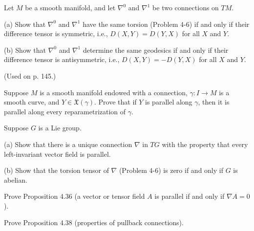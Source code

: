 \begin{exercise}
\label{prob:connections-difference-tensor}
Let $M$ be a smooth manifold, and let $\nabla^0$ and $\nabla^1$ be two connections on $TM$.

(a) Show that $\nabla^0$ and $\nabla^1$ have the same torsion (Problem 4-6) if and only if their difference tensor is symmetric, i.e., $D(X,Y) = D(Y,X)$ for all $X$ and $Y$.

(b) Show that $\nabla^0$ and $\nabla^1$ determine the same geodesics if and only if their difference tensor is antisymmetric, i.e., $D(X,Y) = -D(Y,X)$ for all $X$ and $Y$.

(Used on p. 145.)
\end{exercise}

\begin{exercise}
\label{prob:parallel-reparametrization}
Suppose $M$ is a smooth manifold endowed with a connection, $\gamma: I \to M$ is a smooth curve, and $Y \in \mathfrak{X}(\gamma)$. Prove that if $Y$ is parallel along $\gamma$, then it is parallel along every reparametrization of $\gamma$.
\end{exercise}

\begin{exercise}
\label{prob:lie-group-connection}
Suppose $G$ is a Lie group.

(a) Show that there is a unique connection $\nabla$ in $TG$ with the property that every left-invariant vector field is parallel.

(b) Show that the torsion tensor of $\nabla$ (Problem 4-6) is zero if and only if $G$ is abelian.
\end{exercise}

\begin{exercise}
\label{prob:parallel-tensor-fields}
Prove Proposition 4.36 (a vector or tensor field $A$ is parallel if and only if $\nabla A = 0$).
\end{exercise}

\begin{exercise}
\label{prob:pullback-connections}
Prove Proposition 4.38 (properties of pullback connections).
\end{exercise}

